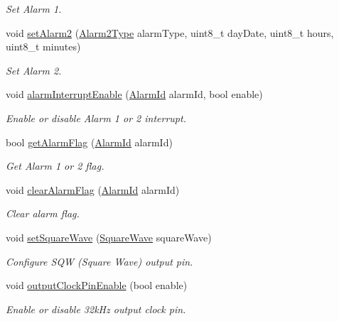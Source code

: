 \begin{DoxyCompactItemize}
\begin{DoxyCompactList}\small\item\em Set Alarm 1. \end{DoxyCompactList}\item 
void \hyperlink{class_d_s3231_a377799172e4f431288e18ff95cf5b7ec}{set\+Alarm2} (\hyperlink{_d_s3231_8h_a2561c628950a85b8f502b7055c3acd8b}{Alarm2\+Type} alarm\+Type, uint8\+\_\+t day\+Date, uint8\+\_\+t hours, uint8\+\_\+t minutes)
\begin{DoxyCompactList}\small\item\em Set Alarm 2. \end{DoxyCompactList}\item 
void \hyperlink{class_d_s3231_a0bcf130e164ba5436a71dbb81621fb35}{alarm\+Interrupt\+Enable} (\hyperlink{_d_s3231_8h_abdac868b647b120d540abd60d35e0feb}{Alarm\+Id} alarm\+Id, bool enable)
\begin{DoxyCompactList}\small\item\em Enable or disable Alarm 1 or 2 interrupt. \end{DoxyCompactList}\item 
bool \hyperlink{class_d_s3231_a77104765708a5f7ab9fbec7c17e145ea}{get\+Alarm\+Flag} (\hyperlink{_d_s3231_8h_abdac868b647b120d540abd60d35e0feb}{Alarm\+Id} alarm\+Id)
\begin{DoxyCompactList}\small\item\em Get Alarm 1 or 2 flag. \end{DoxyCompactList}\item 
void \hyperlink{class_d_s3231_ae70cc93049001d830b926491698fdfb6}{clear\+Alarm\+Flag} (\hyperlink{_d_s3231_8h_abdac868b647b120d540abd60d35e0feb}{Alarm\+Id} alarm\+Id)
\begin{DoxyCompactList}\small\item\em Clear alarm flag. \end{DoxyCompactList}\item 
void \hyperlink{class_d_s3231_a9d5ef58a83a5bde590bf414be67fb4a5}{set\+Square\+Wave} (\hyperlink{_d_s3231_8h_aa45f48b2c6f58f91a278a1601b211140}{Square\+Wave} square\+Wave)
\begin{DoxyCompactList}\small\item\em Configure S\+QW (Square Wave) output pin. \end{DoxyCompactList}\item 
void \hyperlink{class_d_s3231_a345592e12ccf5fc6c887c1414f8a3abb}{output\+Clock\+Pin\+Enable} (bool enable)
\begin{DoxyCompactList}\small\item\em Enable or disable 32k\+Hz output clock pin. \end{DoxyCompactList}\item 

\end{DoxyCompactItemize}
